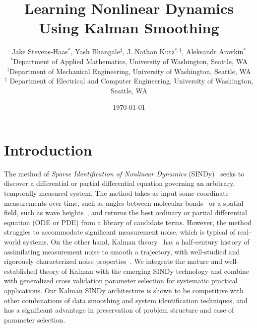 \documentclass{ACCESS_latex_template_20231118/ieeeaccess}
\title{Learning Nonlinear Dynamics Using Kalman Smoothing}
\author{Jake Stevens-Haas$^*$, Yash Bhangale$^{\ddag}$, J. Nathan Kutz$^{*,\dag}$, Aleksandr Aravkin$^*$\\
{\small $^*$Department of Applied Mathematics, University of Washington, Seattle, WA} \\
{\small $^\ddag$Department of Mechanical Engineering, University of Washington, Seattle, WA} \\
{\small $^\dag$ Department of Electrical and Computer Engineering, University of Washington, Seattle, WA} }
\date{\today}
\begin{document}
\maketitle


\section{Introduction}
The method of {\em Sparse Identification of Nonlinear Dynamics} (SINDy)~\citep{Brunton2016,brunton2022data} seeks to discover a differential or partial differential equation governing an arbitrary, temporally measured system.
The method takes as input some coordinate measurements over time, such as angles between molecular bonds~\citep{Boninsegna2018} or a spatial field, such as wave heights~\citep{Rudy2017}, and returns the best ordinary or partial differential equation (ODE or PDE) from a library of candidate terms.
However, the method struggles to accommodate significant measurement noise, which is typical of real-world systems.
On the other hand, Kalman theory~\citep{kalman,KalBuc} has a half-century history of assimilating measurement noise to smooth a trajectory, with well-studied and rigorously characterized noise properties~\citep{welch1995introduction}.
We integrate the mature and well-established theory of Kalman with the emerging SINDy technology and combine with generalized cross validation parameter selection for systematic practical applications.
Our Kalman SINDy architecture is shown to be competitive with other combinations of data smoothing and system identification techniques, and has a significant advantage in preservation of problem structure and ease of parameter selection.
\end{document}
